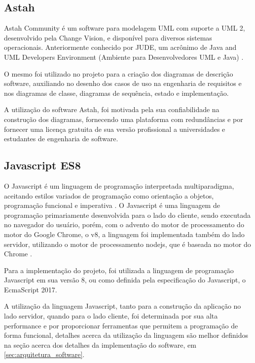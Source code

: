 \subsection{Astah}

Astah Community é um software para modelagem UML com suporte a UML 2, desenvolvido pela Change Vision, e disponível para diversos sistemas operacionais. Anteriormente conhecido por JUDE, um acrônimo de Java and UML Developers Environment (Ambiente para Desenvolvedores UML e Java) \cite{astah_uml}.

O mesmo foi utilizado no projeto para a criação dos diagramas de descrição software, auxiliando no desenho dos casos de uso na engenharia de requisitos e nos diagramas de classe, diagramas de sequência, estado e implementação.

A utilização do software Astah, foi motivada pela sua confiabilidade na construção dos diagramas, fornecendo uma plataforma com redundâncias e por fornecer uma licença gratuita de sua versão profissional a universidades e estudantes de engenharia de software.

\subsection{Javascript ES8}

O Javascript é um linguagem de programação interpretada multiparadigma, aceitando estilos variados de programação como orientação a objetos, programação funcional e imperativa \cite{mozilla_javascript}. O Javascript é uma linguagem de programação primariamente desenvolvida para o lado do cliente, sendo executada no navegador do usuário, porém, com o advento do motor de processamento do motor do Google Chrome, o v8, a linguagem foi implementada também do lado servidor, utilizando o motor de processamento nodejs, que é baseada no motor do Chrome \cite{nodejs_about}.

Para a implementação do projeto, foi utilizada a linguagem de programação Javascript em sua versão 8, ou como definida pela especificação do Javascript, o EcmaScript 2017.

A utilização da linguagem Javascript, tanto para a construção da aplicação no lado servidor, quando para o lado cliente, foi determinada por sua alta performance e por proporcionar ferramentas que permitem a programação de forma funcional, detalhes acerca da utilização da linguagem são melhor definidos na seção acerca dos detalhes da implementação do software, em \ref{sec:arquitetura_software}.

